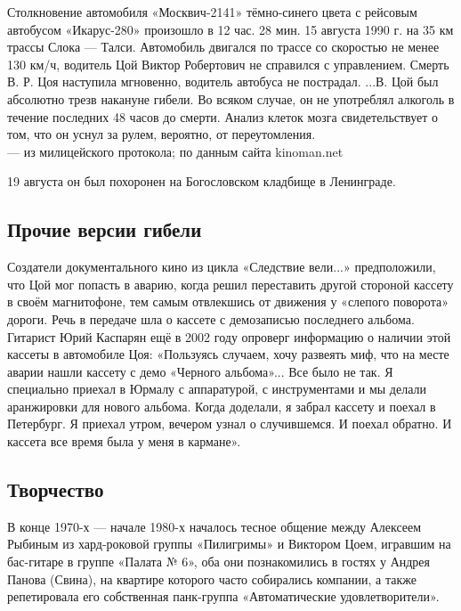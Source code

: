 \begin{fancyquotes}
    Столкновение автомобиля «Москвич-2141» тёмно-синего цвета с рейсовым автобусом «Икарус-280» произошло в 12 час. 28 мин. 15 августа 1990 г. на 35 км трассы Слока --- Талси. Автомобиль двигался по трассе со скоростью не менее 130 км/ч, водитель Цой Виктор Робертович не справился с управлением. Смерть В. Р. Цоя наступила мгновенно, водитель автобуса не пострадал. ...В. Цой был абсолютно трезв накануне гибели. Во всяком случае, он не употреблял алкоголь в течение последних 48 часов до смерти. Анализ клеток мозга свидетельствует о том, что он уснул за рулем, вероятно, от переутомления.\\

    --- из милицейского протокола; по данным сайта kinoman.net
\end{fancyquotes}




19 августа он был похоронен на Богословском кладбище в Ленинграде.

\subsection{Прочие версии гибели}
Создатели документального кино из цикла «Следствие вели...» предположили, что Цой мог попасть в аварию, когда решил переставить другой стороной кассету в своём магнитофоне, тем самым отвлекшись от движения у «слепого поворота» дороги. Речь в передаче шла о кассете с демозаписью последнего альбома. Гитарист Юрий Каспарян ещё в 2002 году опроверг информацию о наличии этой кассеты в автомобиле Цоя: «Пользуясь случаем, хочу развеять миф, что на месте аварии нашли кассету с демо «Черного альбома»... Все было не так. Я специально приехал в Юрмалу с аппаратурой, с инструментами и мы делали аранжировки для нового альбома. Когда доделали, я забрал кассету и поехал в Петербург. Я приехал утром, вечером узнал о случившемся. И поехал обратно. И кассета все время была у меня в кармане».


\subsection{Творчество}
В конце 1970-х --- начале 1980-х началось тесное общение между Алексеем Рыбиным из хард-роковой группы «Пилигримы» и Виктором Цоем, игравшим на бас-гитаре в группе «Палата № 6», оба они познакомились в гостях у Андрея Панова (Свина), на квартире которого часто собирались компании, а также репетировала его собственная панк-группа «Автоматические удовлетворители».

